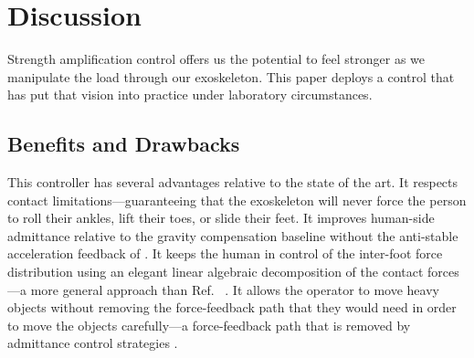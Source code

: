 \documentclass[utf8]{frontiersSCNS}
\renewcommand*{\cite}[1]{\citep{#1}}
\begin{document}










\section{Discussion}\label{sec:disc}


Strength amplification control offers us the potential to feel stronger as we manipulate the load through our exoskeleton.
This paper deploys a control that has put that vision into practice under laboratory circumstances.



\subsection{Benefits and Drawbacks}

This controller has several advantages relative to the state of the art.
It respects contact limitations---guaranteeing that the exoskeleton will never force the person to roll their ankles, lift their toes, or slide their feet.
It improves human-side admittance relative to the gravity compensation baseline without the anti-stable acceleration feedback of \cite{KazerooniRacineHuangSteger2005ICRA}.
It keeps the human in control of the inter-foot force distribution using an elegant linear algebraic decomposition of the contact forces---a more general approach than Ref.~ \cite{JacobsenOlivier2014Patent}.
It allows the operator to move heavy objects without removing the force-feedback path that they would need in order to move the objects carefully---a force-feedback path that is removed by admittance control strategies \cite{FontanaVertechyMarcheschiSalsedoBergamasco2014RAM}.
\end{document}
